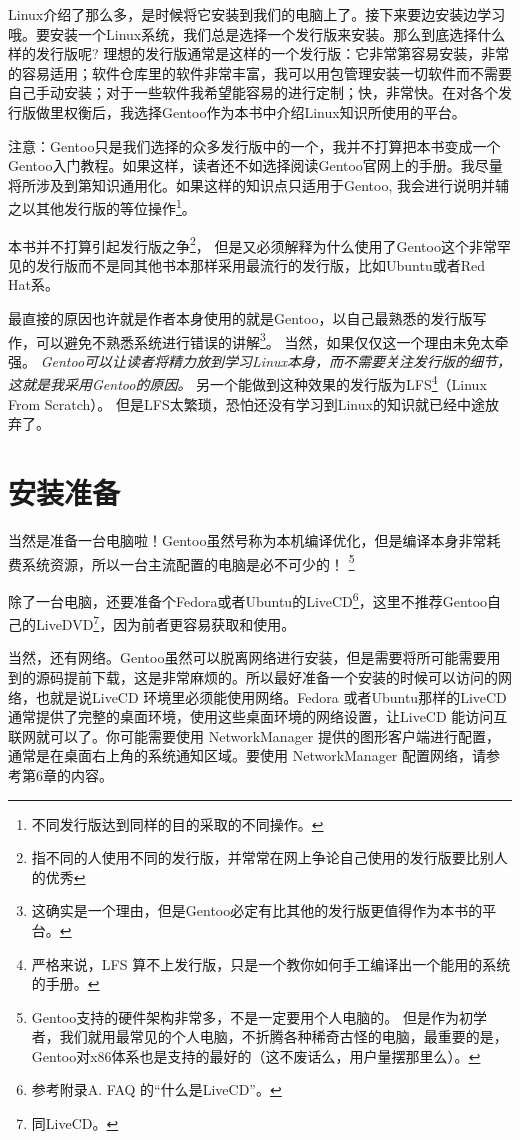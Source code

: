 

Linux介绍了那么多，是时候将它安装到我们的电脑上了。接下来要边安装边学习哦。要安装一个Linux系统，我们总是选择一个发行版来安装。那么到底选择什么样的发行版呢? 理想的发行版通常是这样的一个发行版：它非常第容易安装，非常的容易适用；软件仓库里的软件非常丰富，我可以用包管理安装一切软件而不需要自己手动安装；对于一些软件我希望能容易的进行定制；快，非常快。在对各个发行版做里权衡后，我选择Gentoo作为本书中介绍Linux知识所使用的平台。


\begin{notice}
 注意：Gentoo只是我们选择的众多发行版中的一个，我并不打算把本书变成一个Gentoo入门教程。如果这样，读者还不如选择阅读Gentoo官网上的手册。我尽量将所涉及到第知识通用化。如果这样的知识点只适用于Gentoo, 我会进行说明并辅之以其他发行版的等位操作\footnote{不同发行版达到同样的目的采取的不同操作。}。
\end{notice}

本书并不打算引起发行版之争\footnote{指不同的人使用不同的发行版，并常常在网上争论自己使用的发行版要比别人的优秀}，
但是又必须解释为什么使用了Gentoo这个非常罕见的发行版而不是同其他书本那样采用最流行的发行版，比如Ubuntu或者Red Hat系。

最直接的原因也许就是作者本身使用的就是Gentoo，以自己最熟悉的发行版写作，可以避免不熟悉系统进行错误的讲解\footnote{这确实是一个理由，但是Gentoo必定有比其他的发行版更值得作为本书的平台。}。
当然，如果仅仅这一个理由未免太牵强。
{ \it Gentoo可以让读者将精力放到学习Linux本身，而不需要关注发行版的细节，这就是我采用Gentoo的原因。}
另一个能做到这种效果的发行版为LFS\footnote{严格来说，LFS 算不上发行版，只是一个教你如何手工编译出一个能用的系统的手册。}（Linux From Scratch）。
但是LFS太繁琐，恐怕还没有学习到Linux的知识就已经中途放弃了。


\section{安装准备}

当然是准备一台电脑啦！Gentoo虽然号称为本机编译优化，但是编译本身非常耗费系统资源，所以一台主流配置的电脑是必不可少的！
\footnote{Gentoo支持的硬件架构非常多，不是一定要用个人电脑的。
但是作为初学者，我们就用最常见的个人电脑，不折腾各种稀奇古怪的电脑，最重要的是，Gentoo对x86体系也是支持的最好的（这不废话么，用户量摆那里么）。}


除了一台电脑，还要准备个Fedora或者Ubuntu的LiveCD\footnote{参考附录A. FAQ 的“什么是LiveCD”。
}，这里不推荐Gentoo自己的LiveDVD\footnote{同LiveCD。}，因为前者更容易获取和使用。

当然，还有网络。Gentoo虽然可以脱离网络进行安装，但是需要将所可能需要用到的源码提前下载，这是非常麻烦的。所以最好准备一个安装的时候可以访问的网络，也就是说LiveCD 环境里必须能使用网络。Fedora 或者Ubuntu那样的LiveCD 通常提供了完整的桌面环境，使用这些桌面环境的网络设置，让LiveCD 能访问互联网就可以了。你可能需要使用 NetworkManager 提供的图形客户端进行配置，通常是在桌面右上角的系统通知区域。要使用 NetworkManager 配置网络，请参考第6章的内容。

